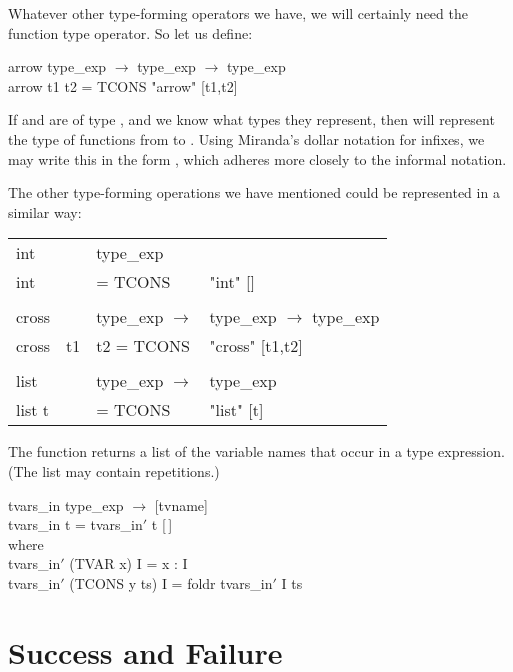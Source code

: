 Whatever other type-forming operators we have, we will certainly need the
function type operator. So let us define:
\begin{mlcoded}
    arrow \hastype{} type\_exp $\rightarrow$ type\_exp $\rightarrow$ type\_exp \\
    arrow t1 t2 = TCONS "arrow" [t1,t2]
\end{mlcoded}
If  and  are of type , and we know what types they represent, then
 will represent the type of functions from  to . Using Miranda's
dollar notation for infixes, we may write this in the form , which
adheres more closely to the informal notation.

The other type-forming operations we have mentioned could be
represented in a similar way:
\begin{mlcoded}
\begin{tabular}{llll}
int &\hastype{} &type\_exp &\\
int & & \phantom{t2} = TCONS &"int" [] \\
&&&\\
cross &\hastype{} &type\_exp $\rightarrow$ &type\_exp $\rightarrow$ type\_exp \\
cross &t1 &t2 = TCONS &"cross" [t1,t2] \\
&&&\\
list & &type\_exp $\rightarrow$ &type\_exp \\
list t & & \phantom{t2} = TCONS &"list" [t]
\end{tabular}
\end{mlcoded}

The function  returns a list of the variable names that occur in a type
expression. (The list may contain repetitions.)
\begin{mlcoded}
    tvars\_in \hastype{} type\_exp $\rightarrow$ [tvname] \\
    tvars\_in t = tvars\_in$'$ t [\,] \\
    \qquad where \\
    \qquad \phantom{XX} tvars\_in$'$ (TVAR x) I = x : I \\
    \qquad \phantom{XX} tvars\_in$'$ (TCONS y ts) I = foldr tvars\_in$'$ I ts
\end{mlcoded}

\section{Success and Failure}

